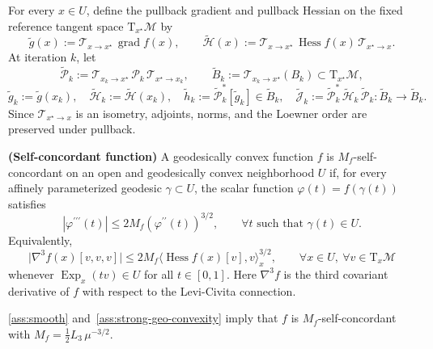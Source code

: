 \documentclass[final,onefignum,onetabnum]{siamart250211}
\DeclareMathOperator{\grad}{grad}
\newcommand{\Hess}{\operatorname{Hess}}
\DeclareMathOperator{\Exp}{Exp}
\begin{document}
For every $x\in U$, define the pullback gradient and pullback Hessian on the fixed reference tangent space $\mathrm{T}_{x^\star}\mathcal{M}$ by
\[
\widetilde g(x)
:=
\mathcal T_{x\to x^\star}\,\grad f(x),
\qquad
\widetilde{\mathcal H}(x)
:=
\mathcal T_{x\to x^\star}\,\Hess f(x)\,\mathcal T_{x^\star\to x}.
\]
At iteration $k$, let
\[
\widetilde{\mathcal P}_k
:=
\mathcal T_{x_k\to x^\star}\,\mathcal P_k\,\mathcal T_{x^\star\to x_k},
\qquad
\widetilde B_k:=\mathcal T_{x_k\to x^\star}(B_k)\subset \mathrm{T}_{x^\star}\mathcal{M},
\]
\[
\widetilde g_k:=\widetilde g(x_k),
\quad
\widetilde{\mathcal H}_k:=\widetilde{\mathcal H}(x_k),
\quad
\widetilde h_k:=\widetilde{\mathcal P}_k^*[\widetilde g_k]\in \widetilde B_k,
\quad
\widetilde{\mathcal J}_k:=\widetilde{\mathcal P}_k^*\,\widetilde{\mathcal H}_k\,\widetilde{\mathcal P}_k:\widetilde B_k\to \widetilde B_k.
\]
Since $\mathcal T_{x^\star\to x}$ is an isometry, adjoints, norms, and the Loewner order are preserved under pullback.

\begin{definition}
  \textbf{(Self-concordant function)}
  A geodesically convex function $f$ is $M_f$-self-concordant on an open and geodesically convex neighborhood $U$ if, for every affinely parameterized geodesic $\gamma\subset U$, the scalar function $\varphi(t)=f(\gamma(t))$ satisfies
  \[
  \left|\varphi^{\prime\prime\prime}(t)\right|
  \le 2M_f\left(\varphi^{\prime\prime}(t)\right)^{3/2},
  \qquad
  \forall t \text{ such that } \gamma(t)\in U.
  \]
  Equivalently,
  \[
  \big|\nabla^{3} f(x)[v,v,v]\big|
  \le 2 M_f \big\langle \Hess f(x)[v], v\big\rangle_x^{3/2},
  \qquad
  \forall x\in U,\ \forall v\in \mathrm{T}_x\mathcal{M}
  \]
  whenever $\Exp_x(tv)\in U$ for all $t\in[0,1]$. Here $\nabla^3 f$ is the third covariant derivative of $f$ with respect to the Levi-Civita connection.
\end{definition}

\begin{corollary}
\cref{ass:smooth} and~\cref{ass:strong-geo-convexity} imply that $f$ is $M_f$-self-concordant with
$
M_f=\frac{1}{2}L_3\,\mu^{-3/2}
$.
\end{corollary}
\end{document}

